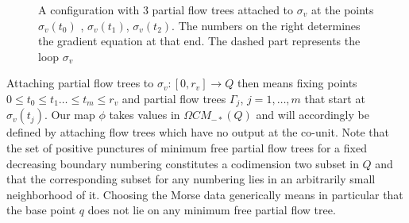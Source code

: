 \documentclass{gtpart}
\begin{document}
\begin{figure}[h!]
    \centering
    \caption{A configuration with 3 partial flow trees attached to $\sigma_v$ at the points $\sigma_v(t_0)$ ,
    $\sigma_v(t_1)$, $\sigma_v(t_2)$. The numbers on the right determines the gradient equation at
    that end. The dashed part represents the loop $\sigma_v$}   \label{adamsmap}
\end{figure}

Attaching partial flow trees to $\sigma_{v}\colon[0,r_{v}]\to Q$ then means fixing points $0\le t_{0}\le t_{1}\dots\le t_{m}\le r_{v}$ and partial flow trees $\Gamma_{j}$, $j=1,\dots,m$ that start at $\sigma_{v}(t_{j})$. Our map $\phi$ takes
values in $\Omega CM_{-\ast}(Q)$ and will accordingly be defined by attaching flow
trees which have no output at the co-unit. Note that the set of positive punctures of minimum free partial flow trees for a fixed
decreasing boundary numbering constitutes a codimension two subset in $Q$ and that the corresponding
subset for any numbering lies in an arbitrarily small neighborhood of it. Choosing the Morse data generically means in particular that the base point $q$ does not lie on any minimum free partial flow tree. 
\end{document}
